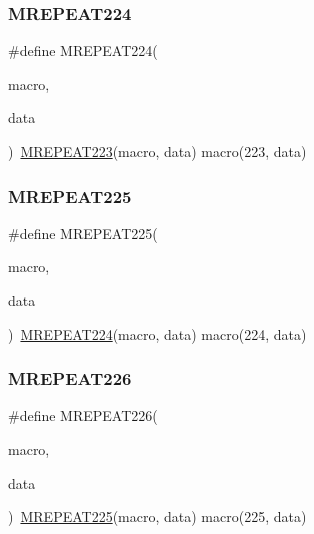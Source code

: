 \mbox{\label{group__group__sam0__utils__mrepeat_ga3b9133ba29da0660d2b743093e68538a}} 
\subsubsection{\texorpdfstring{MREPEAT224}{MREPEAT224}}
{\footnotesize\ttfamily \#define M\+R\+E\+P\+E\+A\+T224(\begin{DoxyParamCaption}\item[{}]{macro,  }\item[{}]{data }\end{DoxyParamCaption})~\mbox{\hyperlink{group__group__sam0__utils__mrepeat_ga6d10ab8a91d39e5445dd73345376b1c0}{M\+R\+E\+P\+E\+A\+T223}}(macro, data)   macro(223, data)}

\mbox{\label{group__group__sam0__utils__mrepeat_ga7a35ac51829f1231cd1f15d17bd69e90}} 
\subsubsection{\texorpdfstring{MREPEAT225}{MREPEAT225}}
{\footnotesize\ttfamily \#define M\+R\+E\+P\+E\+A\+T225(\begin{DoxyParamCaption}\item[{}]{macro,  }\item[{}]{data }\end{DoxyParamCaption})~\mbox{\hyperlink{group__group__sam0__utils__mrepeat_ga3b9133ba29da0660d2b743093e68538a}{M\+R\+E\+P\+E\+A\+T224}}(macro, data)   macro(224, data)}

\mbox{\label{group__group__sam0__utils__mrepeat_ga4a34529f9fa47949482c0d37bdacd3c8}} 
\subsubsection{\texorpdfstring{MREPEAT226}{MREPEAT226}}
{\footnotesize\ttfamily \#define M\+R\+E\+P\+E\+A\+T226(\begin{DoxyParamCaption}\item[{}]{macro,  }\item[{}]{data }\end{DoxyParamCaption})~\mbox{\hyperlink{group__group__sam0__utils__mrepeat_ga7a35ac51829f1231cd1f15d17bd69e90}{M\+R\+E\+P\+E\+A\+T225}}(macro, data)   macro(225, data)}

